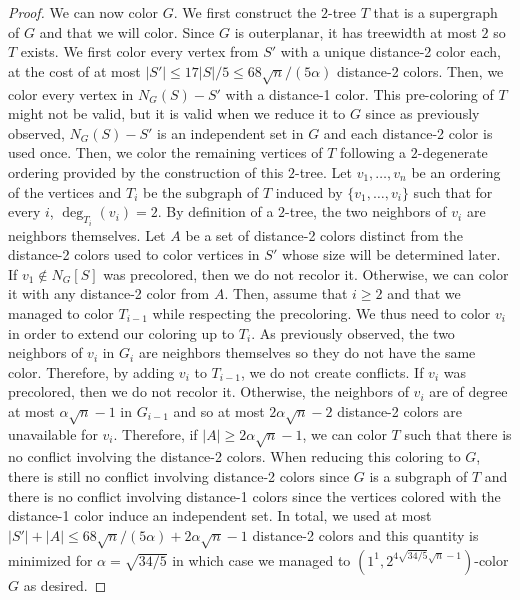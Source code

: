 \documentclass{article}
\newcommand{\colo}[2]{(1^{#1}, 2^{#2})}
\begin{document}
\begin{proof}
    We can now color $G$. We first construct the $2$-tree $T$ that is a supergraph of $G$ and that we will color. Since $G$ is outerplanar, it has treewidth at most $2$ so $T$ exists. We first color every vertex from $S'$ with a unique distance-2 color each, at the cost of at most $|S'| \leq 17|S|/5 \le 68\sqrt{n}/(5\alpha)$ distance-2 colors. Then, we color every vertex in $N_G(S) - S'$ with a distance-1 color. This pre-coloring of $T$ might not be valid, but it is valid when we reduce it to $G$ since as previously observed, $N_G(S) - S'$ is an independent set in $G$ and each distance-2 color is used once. Then, we color the remaining vertices of $T$ following a $2$-degenerate ordering provided by the construction of this $2$-tree. 
    Let $v_1, \dots, v_n$ be an ordering of the vertices and $T_i$ be the subgraph of $T$ induced by $\{v_1, \dots, v_i\}$ such that for every $i$, $\deg_{T_i}(v_i) = 2$. By definition of a $2$-tree, the two neighbors of $v_i$ are neighbors themselves. Let $A$ be a set of distance-2 colors distinct from the distance-2 colors used to color vertices in $S'$ whose size will be determined later. If $v_1 \not\in N_G[S]$ was precolored, then we do not recolor it. Otherwise, we can color it with any distance-2 color from $A$. 
    Then, assume that $i \ge 2$ and that we managed to color $T_{i - 1}$ while respecting the precoloring. We thus need to color $v_i$ in order to extend our coloring up to $T_i$.
    As previously observed, the two neighbors of $v_i$ in $G_i$ are neighbors themselves so they do not have the same color. Therefore, by adding $v_i$ to $T_{i - 1}$, we do not create conflicts. If $v_i$ was precolored, then we do not recolor it. Otherwise, the neighbors of $v_i$ are of degree at most $\alpha \sqrt{n} - 1$ in $G_{i - 1}$ and so at most $2\alpha \sqrt{n} - 2$ distance-2 colors are unavailable for $v_i$. Therefore, if $|A| \geq 2\alpha \sqrt{n} - 1$, we can color $T$ such that there is no conflict involving the distance-2 colors. When reducing this coloring to $G$, there is still no conflict involving distance-2 colors since $G$ is a subgraph of $T$ and there is no conflict involving distance-1 colors since the vertices colored with the distance-1 color induce an independent set. In total, we used at most $|S'| + |A| \le 68\sqrt{n}/(5\alpha) +  2\alpha \sqrt{n} - 1$ distance-2 colors and this quantity is minimized for $\alpha = \sqrt{34/5}$ in which case we managed to $\colo{1}{4\sqrt{34/5}\sqrt{n} - 1}$-color $G$ as desired.
\end{proof}
\end{document}
